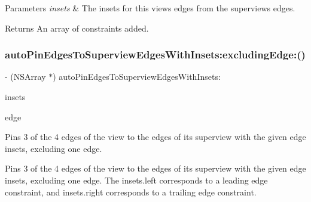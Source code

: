 \begin{DoxyParams}{Parameters}
{\em insets} & The insets for this view\textquotesingle{}s edges from the superview\textquotesingle{}s edges. \\
\hline
\end{DoxyParams}
\begin{DoxyReturn}{Returns}
An array of constraints added. 
\end{DoxyReturn}
\mbox{\label{category_u_i_view_07_auto_layout_08_aacb05ebd025ca11841c6bafb50c2c4d3}} 
\subsubsection{\texorpdfstring{auto\+Pin\+Edges\+To\+Superview\+Edges\+With\+Insets\+:excluding\+Edge\+:()}{autoPinEdgesToSuperviewEdgesWithInsets:excludingEdge:()}}
{\footnotesize\ttfamily -\/ (N\+S\+Array $\ast$) auto\+Pin\+Edges\+To\+Superview\+Edges\+With\+Insets\+: \begin{DoxyParamCaption}\item[{(U\+I\+Edge\+Insets)}]{insets }\item[{excludingEdge:(A\+L\+Edge)}]{edge }\end{DoxyParamCaption}}

Pins 3 of the 4 edges of the view to the edges of its superview with the given edge insets, excluding one edge.

Pins 3 of the 4 edges of the view to the edges of its superview with the given edge insets, excluding one edge. The insets.\+left corresponds to a leading edge constraint, and insets.\+right corresponds to a trailing edge constraint.


